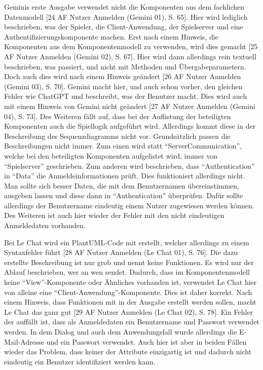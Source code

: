 Geminis erste Ausgabe verwendet nicht die Komponenten aus dem fachlichen Datenmodell [24 AF Nutzer Anmelden (Gemini 01), S. 65]. Hier wird lediglich beschrieben, was der 
Spieler, die Client-Anwendung, der Spielserver und eine Authentifizierungskomponente machen. Erst nach einem Hinweis, die Komponenten 
aus dem Komponentenmodell zu verwenden, wird dies gemacht [25 AF Nutzer Anmelden (Gemini 02), S. 67]. Hier wird dann allerdings rein textuell beschrieben, was passiert, und 
nicht mit Methoden und Übergabeparametern. Doch auch dies wird nach einem Hinweis geändert [26 AF Nutzer Anmelden (Gemini 03), S. 70]. Gemini macht hier, und auch schon vorher, 
den gleichen Fehler wie ChatGPT und beschreibt, was der Benutzer macht. Dies wird auch mit einem Hinweis von Gemini nicht geändert [27 AF Nutzer Anmelden (Gemini 04), S. 73]. 
Des Weiteren fällt auf, dass bei der Auflistung der beteiligten Komponenten auch die Spiellogik aufgeführt wird. Allerdings kommt 
diese in der Beschreibung des Sequenzdiagramms nicht vor. Grundsätzlich passen die Beschreibungen nicht immer. Zum einen wird statt 
``ServerCommunication'', welche bei den beteiligten Komponenten aufgelistet wird, immer von ``Spielserver'' geschrieben. Zum anderen wird 
beschrieben, dass ``Authentication'' in ``Data'' die Anmeldeinformationen prüft. Dies funktioniert allerdings nicht. Man sollte sich 
besser Daten, die mit dem Benutzernamen übereinstimmen, ausgeben lassen und diese dann in ``Authentication'' überprüfen. Dafür sollte allerdings 
der Benutzername eindeutig einem Nutzer zugewiesen werden können. Des Weiteren ist auch hier wieder der Fehler mit den nicht eindeutigen 
Anmeldedaten vorhanden.

Bei Le Chat wird ein PlantUML-Code mit erstellt, welcher allerdings zu einem Syntaxfehler führt [28 AF Nutzer Anmelden (Le Chat 01), S. 76]. Die dazu erstellte Beschreibung ist 
nur grob und nennt keine Funktionen. Es wird nur der Ablauf beschrieben, wer an wen sendet. Dadurch, dass im Komponentenmodell keine 
``View''-Komponente oder Ähnliches vorhanden ist, verwendet Le Chat hier von alleine eine ``Client-Anwendung''-Komponente. Dies ist daher 
korrekt. Nach einem Hinweis, dass Funktionen mit in der Ausgabe erstellt werden sollen, macht Le Chat das ganz gut [29 AF Nutzer Anmelden (Le Chat 02), S. 78]. Ein Fehler der 
auffällt ist, dass als Anmeldedaten ein Benutzername und Passwort verwendet werden. In dem Dialog und auch dem Anwendungsfall wurde 
allerdings die E-Mail-Adresse und ein Passwort verwendet. Auch hier ist aber in beiden Fällen wieder das Problem, dass keiner der 
Attribute einzigartig ist und dadurch nicht eindeutig ein Benutzer identifiziert werden kann.

